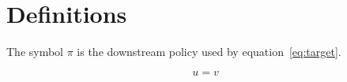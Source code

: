 \section{Definitions}
\begin{definition}\label{def:policy}
The symbol $\pi$ is the downstream policy used by equation~\ref{eq:target}.
\end{definition}
\begin{equation}\label{eq:duplicate}
u = v
\end{equation}
